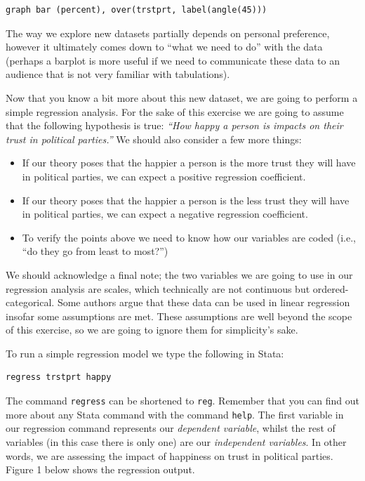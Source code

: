 \documentclass{article}
\begin{document}
\begin{lstlisting}
graph bar (percent), over(trstprt, label(angle(45)))
\end{lstlisting}

The way we explore new datasets partially depends on personal preference, however it ultimately comes down to ``what we need to do'' with the data (perhaps a barplot is more useful if we need to communicate these data to an audience that is not very familiar with tabulations).

Now that you know a bit more about this new dataset, we are going to perform a simple regression analysis. For the sake of this exercise we are going to assume that the following hypothesis is true: \textit{``How happy a person is impacts on their trust in political parties.''} We should also consider a few more things:

\begin{itemize}
	\item If our theory poses that the happier a person is the more trust they will have in political parties, we can expect a positive regression coefficient.
	\item If our theory poses that the happier a person is the less trust they will have in political parties, we can expect a negative regression coefficient.
	\item To verify the points above we need to know how our variables are coded (i.e., ``do they go from least to most?'')
\end{itemize}

We should acknowledge a final note; the two variables we are going to use in our regression analysis are scales, which technically are not continuous but ordered-categorical. Some authors argue that these data can be used in linear regression insofar some assumptions are met. These assumptions are well beyond the scope of this exercise, so we are going to ignore them for simplicity's sake.

To run a simple regression model we type the following in Stata:

\begin{lstlisting}
regress trstprt happy
\end{lstlisting}

The command \texttt{regress} can be shortened to \texttt{reg}. Remember that you can find out more about any Stata command with the command \texttt{help}. The first variable in our regression command represents our \textit{dependent variable}, whilst the rest of variables (in this case there is only one) are our \textit{independent variables}. In other words, we are assessing the impact of happiness on trust in political parties. Figure 1 below shows the regression output.
\end{document}
